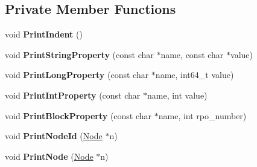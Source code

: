 \subsection*{Private Member Functions}
\begin{DoxyCompactItemize}
\item 
void {\bfseries Print\+Indent} ()\hypertarget{classv8_1_1internal_1_1compiler_1_1_graph_c1_visualizer_a11ba85fc15ad73466ec18d9790abe646}{}\label{classv8_1_1internal_1_1compiler_1_1_graph_c1_visualizer_a11ba85fc15ad73466ec18d9790abe646}

\item 
void {\bfseries Print\+String\+Property} (const char $\ast$name, const char $\ast$value)\hypertarget{classv8_1_1internal_1_1compiler_1_1_graph_c1_visualizer_a35ec02d97767b4cecb83608d152ea188}{}\label{classv8_1_1internal_1_1compiler_1_1_graph_c1_visualizer_a35ec02d97767b4cecb83608d152ea188}

\item 
void {\bfseries Print\+Long\+Property} (const char $\ast$name, int64\+\_\+t value)\hypertarget{classv8_1_1internal_1_1compiler_1_1_graph_c1_visualizer_acb961294663b1938c7ac002c84be286a}{}\label{classv8_1_1internal_1_1compiler_1_1_graph_c1_visualizer_acb961294663b1938c7ac002c84be286a}

\item 
void {\bfseries Print\+Int\+Property} (const char $\ast$name, int value)\hypertarget{classv8_1_1internal_1_1compiler_1_1_graph_c1_visualizer_a0f5595ff56963b118148987b760c5ca7}{}\label{classv8_1_1internal_1_1compiler_1_1_graph_c1_visualizer_a0f5595ff56963b118148987b760c5ca7}

\item 
void {\bfseries Print\+Block\+Property} (const char $\ast$name, int rpo\+\_\+number)\hypertarget{classv8_1_1internal_1_1compiler_1_1_graph_c1_visualizer_a12addbeb6cc9085567478aa97571429b}{}\label{classv8_1_1internal_1_1compiler_1_1_graph_c1_visualizer_a12addbeb6cc9085567478aa97571429b}

\item 
void {\bfseries Print\+Node\+Id} (\hyperlink{classv8_1_1internal_1_1compiler_1_1_node}{Node} $\ast$n)\hypertarget{classv8_1_1internal_1_1compiler_1_1_graph_c1_visualizer_a2d359904843445ff463f3155d404705c}{}\label{classv8_1_1internal_1_1compiler_1_1_graph_c1_visualizer_a2d359904843445ff463f3155d404705c}

\item 
void {\bfseries Print\+Node} (\hyperlink{classv8_1_1internal_1_1compiler_1_1_node}{Node} $\ast$n)\hypertarget{classv8_1_1internal_1_1compiler_1_1_graph_c1_visualizer_a7e28c7f41fc4cfcab0256ce24add4f82}{}\label{classv8_1_1internal_1_1compiler_1_1_graph_c1_visualizer_a7e28c7f41fc4cfcab0256ce24add4f82}


\end{DoxyCompactItemize}
